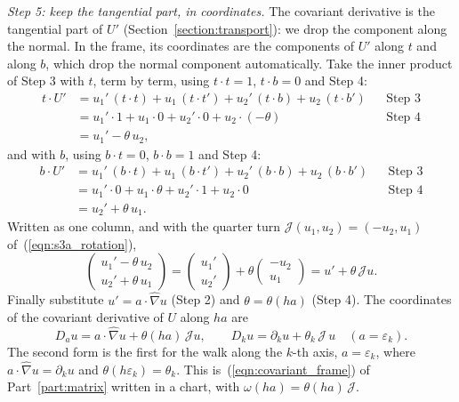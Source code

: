 \emph{Step 5: keep the tangential part, in coordinates.} The covariant derivative is the tangential part of $U'$ (Section~\ref{section:transport}): we drop the component along the normal. In the frame, its coordinates are the components of $U'$ along $t$ and along $b$, which drop the normal component automatically. Take the inner product of Step 3 with $t$, term by term, using $t\cdot t = 1$, $t\cdot b = 0$ and Step 4:
\begin{align*}
t\cdot U' &= u_1'\,(t\cdot t) + u_1\,(t\cdot t') + u_2'\,(t\cdot b) + u_2\,(t\cdot b') && \text{Step 3} \\
&= u_1'\cdot 1 + u_1\cdot 0 + u_2'\cdot 0 + u_2\cdot(-\theta) && \text{Step 4} \\
&= u_1' - \theta\, u_2 ,
\end{align*}
and with $b$, using $b\cdot t = 0$, $b\cdot b = 1$ and Step 4:
\begin{align*}
b\cdot U' &= u_1'\,(b\cdot t) + u_1\,(b\cdot t') + u_2'\,(b\cdot b) + u_2\,(b\cdot b') && \text{Step 3} \\
&= u_1'\cdot 0 + u_1\cdot\theta + u_2'\cdot 1 + u_2\cdot 0 && \text{Step 4} \\
&= u_2' + \theta\, u_1 .
\end{align*}
Written as one column, and with the quarter turn $\mathcal J(u_1, u_2) = (-u_2, u_1)$ of~(\ref{eqn:s3a_rotation}),
\begin{equation*}
\begin{pmatrix} u_1' - \theta\,u_2 \\ u_2' + \theta\,u_1 \end{pmatrix} = \begin{pmatrix} u_1' \\ u_2' \end{pmatrix} + \theta\begin{pmatrix} -u_2 \\ u_1 \end{pmatrix} = u' + \theta\,\mathcal J u .
\end{equation*}
Finally substitute $u' = a\cdot\hat\nabla u$ (Step 2) and $\theta = \theta(ha)$ (Step 4). The coordinates of the covariant derivative of $U$ along $ha$ are
\begin{equation}
\label{eqn:r3_covariant}
D_au = a\cdot\hat\nabla u + \theta(ha)\,\mathcal J u, \qquad D_ku = \partial_ku + \theta_k\,\mathcal J\,u \quad (a = \varepsilon_k) .
\end{equation}
The second form is the first for the walk along the $k$-th axis, $a = \varepsilon_k$, where $a\cdot\hat\nabla u = \partial_ku$ and $\theta(h\varepsilon_k) = \theta_k$. This is~(\ref{eqn:covariant_frame}) of Part~\ref{part:matrix} written in a chart, with $\omega(ha) = \theta(ha)\,\mathcal J$.


